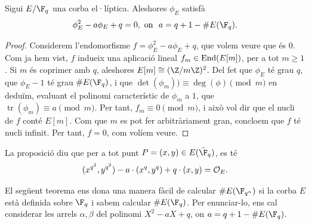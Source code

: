 \begin{proposition}
 Sigui $E/\F_q$ una corba el·líptica. Aleshores $\phi_E$ satisfà
\[
\phi_E^2 - a\phi_E + q =0,\text{ on }\ a= q+1 - \#E(\F_q).
\]
\end{proposition}
\begin{proof}
 Considerem l'endomorfisme $f = \phi_E^2-a\phi_E+q$, que volem veure que és $0$. Com ja hem vist, $f$ indueix una aplicació lineal $f_m\in \operatorname{End}(E[m])$, per a tot $m\geq 1$. Si $m$ és coprimer amb $q$, aleshores $E[m]\cong (\Z/m\Z)^2$. Del fet que $\phi_E$ té grau $q$, que $\phi_E-1$ té grau $\#E(\F_q)$, i que $\det(\phi_m)) \equiv \deg(\phi)\pmod{m}$ en deduïm, evaluant el polinomi característic de $\phi_m$ a $1$, que $\operatorname{tr}(\phi_m) \equiv a \pmod{m}$. Per tant, $f_m\equiv 0\pmod{m}$, i això vol dir que el nucli de $f$ conté $E[m]$. Com que $m$ es pot fer arbitràriament gran, concloem que $f$ té nucli infinit. Per tant, $f=0$, com volíem veure.
\end{proof}
\begin{remark}
\label{remarca:frobenius}
La proposició diu que per a tot punt $P=(x,y) \in E(\bar\F_q)$, es té
\[
(x^{q^2},y^{q^2}) - a\cdot (x^q,y^q) + q\cdot(x,y) = \mathcal{O}_E.
\]
\end{remark}

El següent teorema ens dona una manera fàcil de calcular $\#E(\F_{q^n})$ si la corba $E$ està definida sobre $\F_q$ i sabem calcular $\#E(\F_q)$. Per enunciar-lo, ens cal considerar les arrels $\alpha, \beta$ del polinomi $X^2-aX+q$, on $a=q+1-\#E(\F_q)$.

